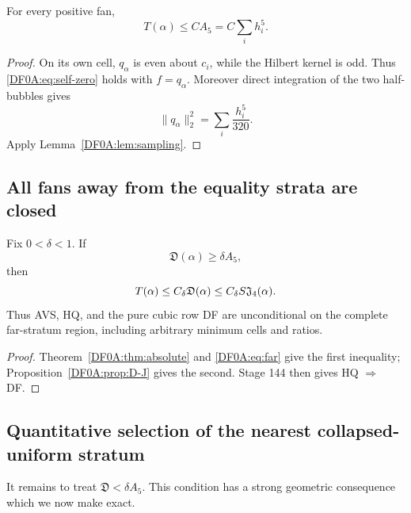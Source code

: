 \begin{theorem}
\label{DF0A:thm:absolute}
For every positive fan,
\begin{equation}\label{DF0A:eq:absolute}
 \boxed{T(\alpha)\le C A_5=C\sum_i h_i^5.}
\end{equation}
\end{theorem}

\begin{proof}
On its own cell, $q_\alpha$ is even about $c_i$, while the Hilbert kernel
is odd.  Thus \eqref{DF0A:eq:self-zero} holds with $f=q_\alpha$.  Moreover
direct integration of the two half-bubbles gives
\[
 \|q_\alpha\|_2^2=\sum_i\frac{h_i^5}{320}.
\]
Apply Lemma~\ref{DF0A:lem:sampling}.
\end{proof}

\subsection{All fans away from the equality strata are closed}

\begin{theorem}
\label{DF0A:thm:far}
Fix $0<\delta<1$.  If
\begin{equation}\label{DF0A:eq:far}
 \mathfrak D(\alpha)\ge\delta A_5,
\end{equation}
then
\begin{equation}\label{DF0A:eq:far-conclusion}
 T(\alpha)\le C_\delta\mathfrak D(\alpha)
 \le C_\delta S\mathfrak J_4(\alpha).
\end{equation}
Thus AVS, HQ, and the pure cubic row DF are unconditional on the complete
far-stratum region, including arbitrary minimum cells and ratios.
\end{theorem}

\begin{proof}
Theorem~\ref{DF0A:thm:absolute} and \eqref{DF0A:eq:far} give the first inequality;
Proposition~\ref{DF0A:prop:D-J} gives the second.  Stage 144 then gives
HQ $\Rightarrow$ DF.
\end{proof}

\subsection{Quantitative selection of the nearest collapsed-uniform stratum}

It remains to treat $\mathfrak D<\delta A_5$.  This condition has a
strong geometric consequence which we now make exact.

